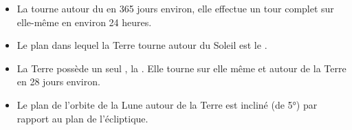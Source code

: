 \begin{mybilan}
	\begin{itemize}
		\item La  tourne autour du  en \num{365} jours environ, elle effectue un tour complet sur elle-même en environ \num{24} heures.
		\item Le plan dans lequel la Terre tourne autour du Soleil est le .
		\item La Terre possède un seul , la . Elle tourne sur elle même et autour de la Terre en 28 jours environ.
		\item Le plan de l'orbite de la Lune autour de la Terre est incliné (de 5°) par rapport au plan de l'écliptique.
	\end{itemize}	
\end{mybilan}